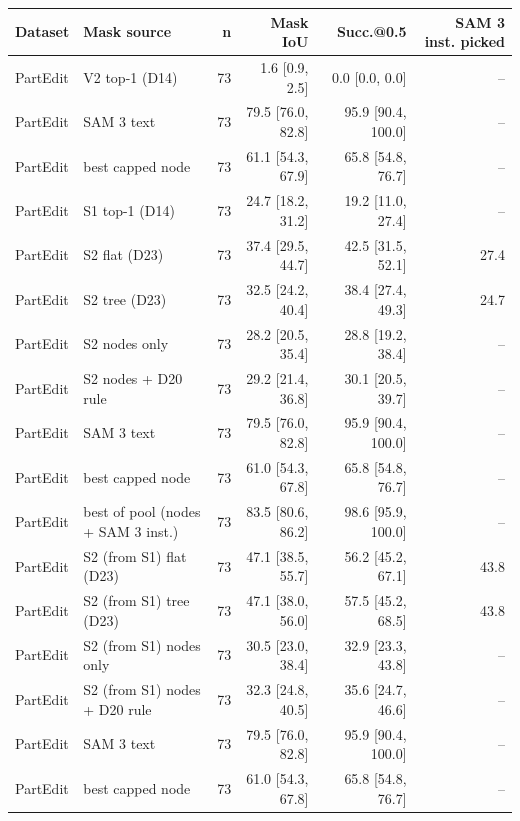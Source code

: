 \begin{tabular}{llrrrr}
\toprule
Dataset & Mask source & n & Mask IoU & Succ.@0.5 & SAM 3 inst. picked \\
\midrule
PartEdit & V2 top-1 (D14) & 73 & 1.6 \scriptsize{[0.9, 2.5]} & 0.0 \scriptsize{[0.0, 0.0]} & -- \\
PartEdit & SAM 3 text & 73 & 79.5 \scriptsize{[76.0, 82.8]} & 95.9 \scriptsize{[90.4, 100.0]} & -- \\
PartEdit & best capped node & 73 & 61.1 \scriptsize{[54.3, 67.9]} & 65.8 \scriptsize{[54.8, 76.7]} & -- \\
PartEdit & S1 top-1 (D14) & 73 & 24.7 \scriptsize{[18.2, 31.2]} & 19.2 \scriptsize{[11.0, 27.4]} & -- \\
\midrule
PartEdit & S2 flat (D23) & 73 & 37.4 \scriptsize{[29.5, 44.7]} & 42.5 \scriptsize{[31.5, 52.1]} & 27.4 \\
PartEdit & S2 tree (D23) & 73 & 32.5 \scriptsize{[24.2, 40.4]} & 38.4 \scriptsize{[27.4, 49.3]} & 24.7 \\
PartEdit & S2 nodes only & 73 & 28.2 \scriptsize{[20.5, 35.4]} & 28.8 \scriptsize{[19.2, 38.4]} & -- \\
PartEdit & S2 nodes + D20 rule & 73 & 29.2 \scriptsize{[21.4, 36.8]} & 30.1 \scriptsize{[20.5, 39.7]} & -- \\
PartEdit & SAM 3 text & 73 & 79.5 \scriptsize{[76.0, 82.8]} & 95.9 \scriptsize{[90.4, 100.0]} & -- \\
PartEdit & best capped node & 73 & 61.0 \scriptsize{[54.3, 67.8]} & 65.8 \scriptsize{[54.8, 76.7]} & -- \\
PartEdit & best of pool (nodes + SAM 3 inst.) & 73 & 83.5 \scriptsize{[80.6, 86.2]} & 98.6 \scriptsize{[95.9, 100.0]} & -- \\
\midrule
PartEdit & S2 (from S1) flat (D23) & 73 & 47.1 \scriptsize{[38.5, 55.7]} & 56.2 \scriptsize{[45.2, 67.1]} & 43.8 \\
PartEdit & S2 (from S1) tree (D23) & 73 & 47.1 \scriptsize{[38.0, 56.0]} & 57.5 \scriptsize{[45.2, 68.5]} & 43.8 \\
PartEdit & S2 (from S1) nodes only & 73 & 30.5 \scriptsize{[23.0, 38.4]} & 32.9 \scriptsize{[23.3, 43.8]} & -- \\
PartEdit & S2 (from S1) nodes + D20 rule & 73 & 32.3 \scriptsize{[24.8, 40.5]} & 35.6 \scriptsize{[24.7, 46.6]} & -- \\
PartEdit & SAM 3 text & 73 & 79.5 \scriptsize{[76.0, 82.8]} & 95.9 \scriptsize{[90.4, 100.0]} & -- \\
PartEdit & best capped node & 73 & 61.0 \scriptsize{[54.3, 67.8]} & 65.8 \scriptsize{[54.8, 76.7]} & -- \\

\end{tabular}
